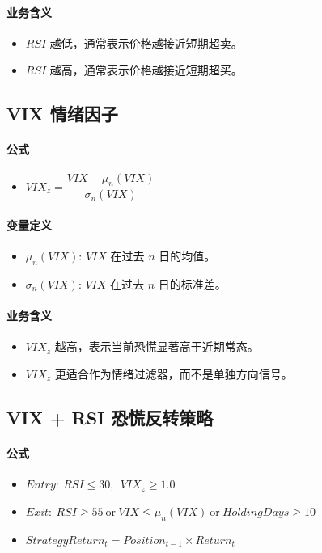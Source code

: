 \documentclass[11pt,a4paper]{ctexart}
\begin{document}
\paragraph{业务含义}
\begin{itemize}
\item $RSI$ 越低，通常表示价格越接近短期超卖。
\item $RSI$ 越高，通常表示价格越接近短期超买。
\end{itemize}
\subsection{VIX 情绪因子}
\paragraph{公式}
\begin{itemize}
\item $VIX_z=\dfrac{VIX-\mu_n(VIX)}{\sigma_n(VIX)}$
\end{itemize}
\paragraph{变量定义}
\begin{itemize}
\item $\mu_n(VIX)$: $VIX$ 在过去 $n$ 日的均值。
\item $\sigma_n(VIX)$: $VIX$ 在过去 $n$ 日的标准差。
\end{itemize}
\paragraph{业务含义}
\begin{itemize}
\item $VIX_z$ 越高，表示当前恐慌显著高于近期常态。
\item $VIX_z$ 更适合作为情绪过滤器，而不是单独方向信号。
\end{itemize}
\subsection{VIX + RSI 恐慌反转策略}
\paragraph{公式}
\begin{itemize}
\item $Entry:\ RSI \leq 30,\ \ VIX_z \geq 1.0$
\item $Exit:\ RSI \geq 55\ \mathrm{or}\ VIX \leq \mu_n(VIX)\ \mathrm{or}\ HoldingDays \geq 10$
\item $StrategyReturn_t=Position_{t-1}\times Return_t$
\end{itemize}
\end{document}
